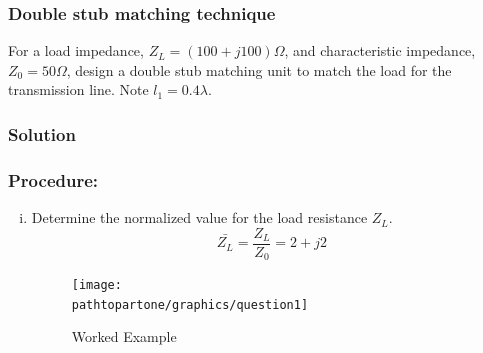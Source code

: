 \begin{exmp}
\subsubsection*{Double stub matching technique}
For a load impedance, $Z_{L} = (100 + j100)\Omega$, and characteristic impedance, $Z_0 = 50\Omega$,  design a double stub matching unit to match the load for the transmission line. Note $l_{1} = 0.4\lambda$.

\subsubsection*{Solution}			
\subsubsection*{Procedure:}
\begin{enumerate}[(i)]
\item Determine the normalized value for the load resistance $Z_{L}$.
\begin{dmath*}
\bar{Z_{L}} = \frac{Z_{L}}{Z_0} = 2 + j2
\end{dmath*}
\begin{figure}[h]
\centering
\texttt{[image: \\pathtopartone/graphics/question1]}
\caption{Worked Example}
\label{fig:question1}
\end{figure}


\end{enumerate}
\end{exmp}
